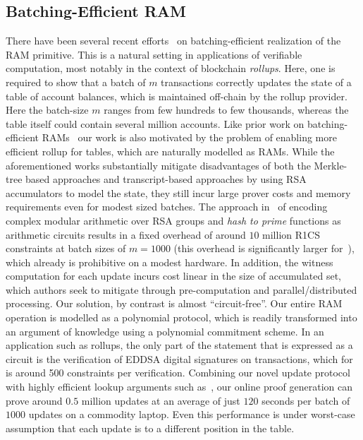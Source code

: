 \subsection{Batching-Efficient RAM}\label{subsec:batching-efficient-ram}
There have been several recent efforts~\cite{USENIX:OWWB20,CCS:CFHKKO22} on batching-efficient
realization of the RAM primitive. This is a natural setting in applications of verifiable
computation, most notably in the context of blockchain {\em rollups}. Here, one is required
to show that a batch of $m$ transactions correctly updates the state of a table of account balances, which
is maintained off-chain by the rollup provider. Here the batch-size $m$ ranges from few hundreds to few
thousands, whereas the table itself could contain several million accounts.
Like prior work on batching-efficient
RAMs~\cite{USENIX:OWWB20,CCS:CFHKKO22} our work is also motivated by the problem of enabling more efficient rollup for tables, which are
naturally modelled as RAMs. While the aforementioned works substantially mitigate disadvantages of both the
Merkle-tree based approaches and transcript-based approaches by using RSA accumulators to model the state,
they still incur large prover costs and memory requirements even for modest sized batches. The approach
in~\cite{USENIX:OWWB20,CCS:CFHKKO22} of encoding complex modular arithmetic over RSA groups and {\em hash
to prime} functions as arithmetic circuits results in a fixed overhead of around $10$ million R1CS constraints
at batch sizes of $m=1000$ (this overhead is significantly larger for~\cite{USENIX:OWWB20}), which already
is prohibitive on a modest hardware. In addition, the witness computation for each update incurs cost
linear in the size of accumulated set, which authors seek to mitigate through pre-computation and
parallel/distributed processing. Our solution, by contrast is almost ``circuit-free''. Our entire
RAM operation is modelled as a polynomial protocol, which is readily transformed into an argument of
knowledge using a polynomial commitment scheme. In an application such as rollups, the only part of the statement 
that is expressed as a circuit is the verification of EDDSA digital signatures on transactions,
which for is around 500 constraints per verification.
Combining our novel update protocol with highly efficient
lookup arguments such as~\cite{EPRINT:EagFioGab22}, our online proof generation can prove around $0.5$ million
updates at an average of just $120$ seconds per batch of $1000$ updates on a commodity laptop. Even
this performance is under worst-case assumption that each update is to a different position in the table.
